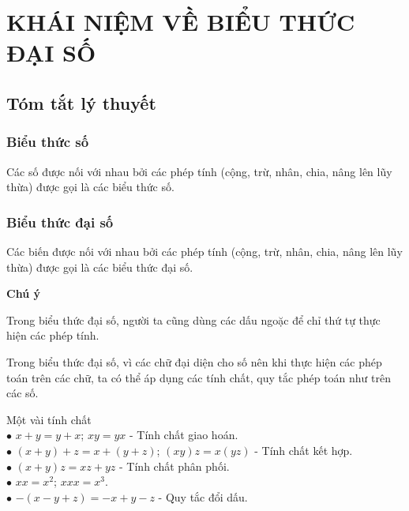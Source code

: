\section{KHÁI NIỆM VỀ BIỂU THỨC ĐẠI SỐ}
\subsection{Tóm tắt lý thuyết}
\subsubsection{Biểu thức số}
\begin{dn}
Các số được nối với nhau bởi các phép tính (cộng, trừ, nhân, chia, nâng lên lũy thừa) được gọi là các biểu thức số.
\end{dn}

\subsubsection{Biểu thức đại số}
\begin{dn}
	Các biến được nối với nhau bởi các phép tính (cộng, trừ, nhân, chia, nâng lên lũy thừa) được gọi là các biểu thức đại số.
\end{dn}

\begin{note}\textbf{Chú ý}
	\begin{enumEX}{1}
		\item Trong biểu thức đại số, người ta cũng dùng các dấu ngoặc để chỉ thứ tự thực hiện các phép tính.
		\item Trong biểu thức đại số, vì các chữ đại diện cho số nên khi thực hiện các phép toán trên các chữ, ta có thể áp dụng các tính chất, quy tắc phép toán như trên các số.
	\begin{vd} Một vài tính chất\\
			$\bullet$ $x+y=y+x$; $xy=yx$ - Tính chất giao hoán.\\
			$\bullet$ $(x+y)+z=x+(y+z)$; $(xy)z=x(yz)$ - Tính chất kết hợp.\\
			$\bullet$ $(x+y)z=xz+yz$ - Tính chất phân phối.\\
			$\bullet$ $xx=x^2$; $xxx=x^3$.\\
			$\bullet$ $-(x-y+z)=-x+y-z$ - Quy tắc đổi dấu.	
	\end{vd}
		
	\end{enumEX}
\end{note}

